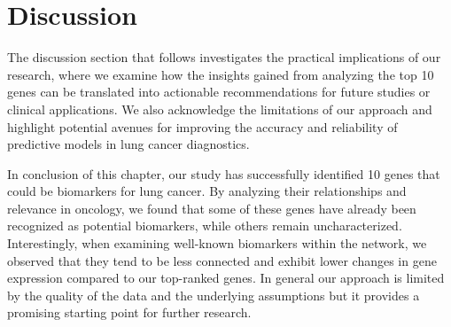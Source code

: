 \section{Discussion} \label{sec:discussion}
The discussion section that follows investigates the practical implications of our research,
where we examine how the insights gained from analyzing the top 10 genes can be translated into actionable recommendations
for future studies or clinical applications.
We also acknowledge the limitations of our approach and
highlight potential avenues for improving the accuracy and reliability of predictive models in lung cancer diagnostics.






In conclusion of this chapter, our study has successfully identified 10 genes that could be biomarkers for lung cancer.
By analyzing their relationships and relevance in oncology,
we found that some of these genes have already been recognized as potential biomarkers, while others remain uncharacterized.
Interestingly, when examining well-known biomarkers within the network,
we observed that they tend to be less connected and exhibit lower changes in gene expression compared to our top-ranked genes.
In general our approach is limited by the quality of the data and the underlying assumptions
but it provides a promising starting point for further research.